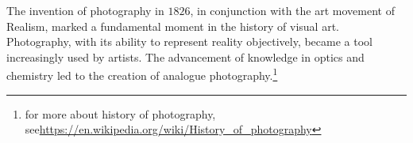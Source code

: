 \noindent The invention of photography in $1826$, in conjunction with the art movement of Realism, marked a fundamental moment in the history of visual art. Photography, with its ability to represent reality objectively, became a tool increasingly used by artists. The advancement of knowledge in optics and chemistry led to the creation of analogue photography.\footnote{for more about history of photography, see\newline\url{https://en.wikipedia.org/wiki/History_of_photography}}
